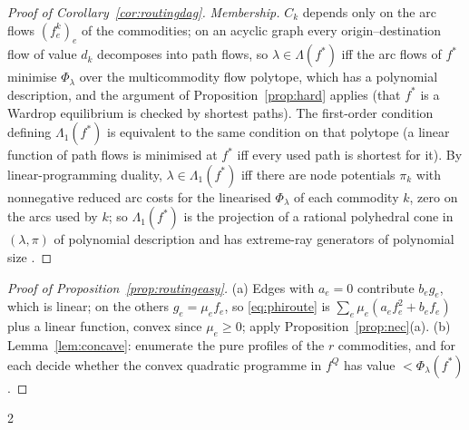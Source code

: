\documentclass[11pt,a4paper]{article}
\theoremstyle{plain}
\theoremstyle{definition}
\theoremstyle{remark}
\newcommand{\Lam}{\Lambda}
\newcommand{\Lone}{\Lambda_{1}}
\begin{document}
\begin{proof}[Proof of Corollary~\ref{cor:routingdag}]
\emph{Membership.} $C_k$ depends only on the arc flows $(f^k_e)_{e}$ of the commodities; on an acyclic graph every origin--destination flow of value $d_k$ decomposes into path flows, so $\lambda\in\Lam(f^*)$ iff the arc flows of $f^*$ minimise $\Phi_\lambda$ over the multicommodity flow polytope, which has a polynomial description, and the argument of Proposition~\ref{prop:hard} applies (that $f^*$ is a Wardrop equilibrium is checked by shortest paths). The first-order condition defining $\Lone(f^*)$ is equivalent to the same condition on that polytope (a linear function of path flows is minimised at $f^*$ iff every used path is shortest for it). By linear-programming duality, $\lambda\in\Lone(f^*)$ iff there are node potentials $\pi_k$ with nonnegative reduced arc costs for the linearised $\Phi_\lambda$ of each commodity $k$, zero on the arcs used by $k$; so $\Lone(f^*)$ is the projection of a rational polyhedral cone in $(\lambda,\pi)$ of polynomial description and has extreme-ray generators of polynomial size \citep[Section~10.2]{schrijver1986}.
\end{proof}

\begin{proof}[Proof of Proposition~\ref{prop:routingeasy}]
(a) Edges with $a_e=0$ contribute $b_eg_e$, which is linear; on the others $g_e=\mu_ef_e$, so \eqref{eq:phiroute} is $\sum_e\mu_e(a_ef_e^2+b_ef_e)$ plus a linear function, convex since $\mu_e\ge0$; apply Proposition~\ref{prop:nec}(a). (b) Lemma~\ref{lem:concave}: enumerate the pure profiles of the $r$ commodities, and for each decide whether the convex quadratic programme in $f^Q$ has value $<\Phi_\lambda(f^*)$.
\end{proof}

\renewcommand{\bibfont}{\footnotesize}\setlength{\bibsep}{0.5pt plus 0.5pt}
\begin{multicols}{2}


\end{multicols}
\end{document}
